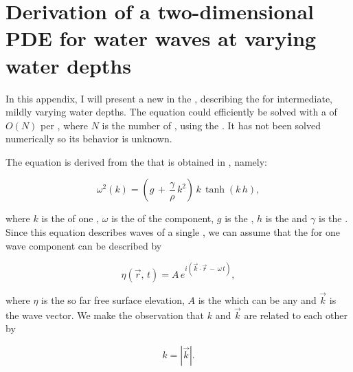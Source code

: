 \chapter{Derivation of a two-dimensional PDE for water waves at varying water depths}
\label{chap:pde_derivation}

In this appendix, I will present a new   \PDE in the , describing the  for intermediate, mildly varying water depths. The equation could efficiently be solved with a  of $O(N)$ per , where $N$ is the number of , using the \CFMM \citep{White1994}. It has not been solved numerically so its behavior is unknown.

The equation is derived from the  that is obtained in  \citep{temp}, namely:

\begin{equation} \label{eq:dispersion}
\omega^2(k) = \left(g\,+\,\frac{\gamma}{\rho}\,k^2\right)\,k\,\tanh(k\,h),
\end{equation}

where $k$ is the  of one , $\omega$ is the  of the component, $g$ is the , $h$ is the  and $\gamma$ is the . Since this equation describes waves of a single , we can assume that the  for one wave component can be described by

\begin{equation} \label{eq:component}
\eta(\vec{r},\,t) = A\,e^{i(\vec{k}\cdot\vec{r}\,-\,\omega\,t)},
\end{equation}

where $\eta$ is the so far  free surface elevation, $A$ is the  which can be any  and $\vec{k}$ is the wave vector. We make the observation that $k$ and $\vec{k}$ are related to each other by

\begin{equation} \label{eq:kvectok}
k = \left|\vec{k}\right|.
\end{equation}

